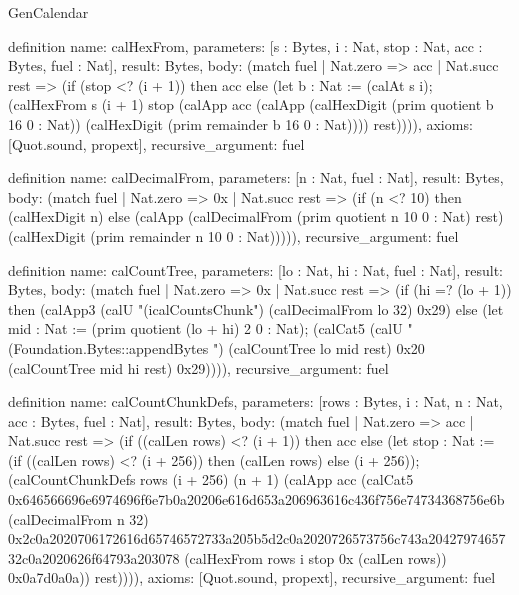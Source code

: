 \begin{lexlean}{GenCalendar}
\begin{semanticmodule}
definition{
  name: calHexFrom,
  parameters: [s : Bytes, i : Nat, stop : Nat, acc : Bytes, fuel : Nat],
  result: Bytes,
  body: (match fuel
    | Nat.zero => acc
    | Nat.succ rest => (if (stop <? (i + 1)) then acc else (let b : Nat := (calAt s i); (calHexFrom s (i + 1) stop (calApp acc (calApp (calHexDigit (prim quotient b 16 0 : Nat)) (calHexDigit (prim remainder b 16 0 : Nat)))) rest)))),
  axioms: [Quot.sound, propext],
  recursive_argument: fuel
}

definition{
  name: calDecimalFrom,
  parameters: [n : Nat, fuel : Nat],
  result: Bytes,
  body: (match fuel
    | Nat.zero => 0x
    | Nat.succ rest => (if (n <? 10) then (calHexDigit n) else (calApp (calDecimalFrom (prim quotient n 10 0 : Nat) rest) (calHexDigit (prim remainder n 10 0 : Nat))))),
  recursive_argument: fuel
}

definition{
  name: calCountTree,
  parameters: [lo : Nat, hi : Nat, fuel : Nat],
  result: Bytes,
  body: (match fuel
    | Nat.zero => 0x
    | Nat.succ rest => (if (hi =? (lo + 1)) then (calApp3 (calU "(icalCountsChunk") (calDecimalFrom lo 32) 0x29) else (let mid : Nat := (prim quotient (lo + hi) 2 0 : Nat); (calCat5 (calU "(Foundation.Bytes::appendBytes ") (calCountTree lo mid rest) 0x20 (calCountTree mid hi rest) 0x29)))),
  recursive_argument: fuel
}

definition{
  name: calCountChunkDefs,
  parameters: [rows : Bytes, i : Nat, n : Nat, acc : Bytes, fuel : Nat],
  result: Bytes,
  body: (match fuel
    | Nat.zero => acc
    | Nat.succ rest => (if ((calLen rows) <? (i + 1)) then acc else (let stop : Nat := (if ((calLen rows) <? (i + 256)) then (calLen rows) else (i + 256)); (calCountChunkDefs rows (i + 256) (n + 1) (calApp acc (calCat5 0x646566696e6974696f6e7b0a20206e616d653a206963616c436f756e74734368756e6b (calDecimalFrom n 32) 0x2c0a2020706172616d65746572733a205b5d2c0a2020726573756c743a2042797465732c0a2020626f64793a203078 (calHexFrom rows i stop 0x (calLen rows)) 0x0a7d0a0a)) rest)))),
  axioms: [Quot.sound, propext],
  recursive_argument: fuel
}


\end{semanticmodule}
\end{lexlean}
